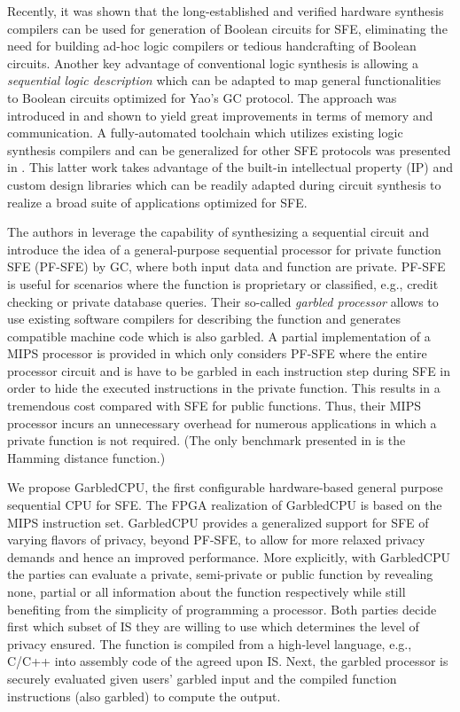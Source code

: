 Recently, it was shown that the long-established and verified hardware synthesis compilers can be used for generation of Boolean circuits for SFE, eliminating the need for building ad-hoc logic compilers or tedious handcrafting of Boolean circuits. Another key advantage of conventional logic synthesis is allowing a \emph{sequential logic description} which can be adapted to map general functionalities to Boolean circuits optimized for Yao's GC protocol. The approach was introduced in \cite{songhori2015tinygarble} and shown to yield great improvements in terms of memory and communication. A fully-automated toolchain which utilizes existing logic synthesis compilers and can be generalized for other SFE protocols was presented in \cite{demmler2015automated}. This latter work takes advantage of the built-in intellectual property (IP) and custom design libraries which can be readily adapted during circuit synthesis to realize a broad suite of applications optimized for SFE.

The authors in \cite{songhori2015tinygarble} leverage the capability of synthesizing a sequential circuit and introduce the idea of a general-purpose sequential processor for private function SFE (PF-SFE) by GC, where both input data and function are private. PF-SFE is useful for scenarios where the function is proprietary or classified, e.g., credit checking or private database queries. Their so-called \emph{garbled processor} allows to use existing software compilers for describing the function and generates compatible machine code which is also garbled. A partial implementation of a MIPS processor is provided in \cite{songhori2015tinygarble} which only considers PF-SFE where the entire processor circuit and \acrfull{is} have to be garbled in each instruction step during SFE in order to hide the executed instructions in the private function. This results in a tremendous cost compared with SFE for public functions. Thus, their MIPS processor incurs an unnecessary overhead for numerous applications in which a private function is not required. (The only benchmark presented in \cite{songhori2015tinygarble} is the Hamming distance function.)

We propose GarbledCPU, the first configurable hardware-based general purpose sequential CPU for SFE. The FPGA realization of GarbledCPU is based on the MIPS instruction set. GarbledCPU provides a generalized support for SFE of varying flavors of privacy, beyond PF-SFE, to allow for more relaxed privacy demands and hence an improved performance. More explicitly, with GarbledCPU the parties can evaluate a private, semi-private or public function by revealing none, partial or all information about the function respectively while still benefiting from the simplicity of programming a processor.
Both parties decide first which subset of IS they are willing to use which determines the level of privacy ensured. The function is compiled from a high-level language, e.g., C/C++ into assembly code of the agreed upon IS. Next, the garbled processor is securely evaluated given users' garbled input and the compiled function instructions (also garbled) to compute the output.


